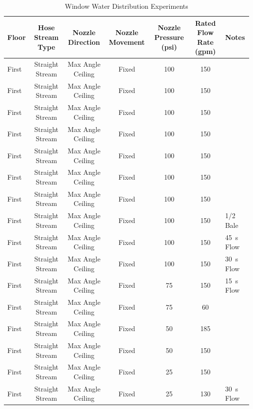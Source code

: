 \documentclass[12pt,oneside]{book}
\begin{document}
\clearpage

\begin{table}[!ht]
\centering
\scriptsize
\caption{Window Water Distribution Experiments}
\label{tab:Window_Fire_Attack_Distribution_Experiments}
\begin{tabular}{lcccccl}
\toprule[1.5pt]
Floor & Hose Stream Type & Nozzle Direction & Nozzle Movement & Nozzle Pressure (psi) & Rated Flow Rate (gpm) & Notes \\ 
\midrule

First  & Straight Stream  & Max Angle Ceiling      & Fixed              & 100 & 150 &   \\
First  & Straight Stream  & Max Angle Ceiling      & Fixed              & 100 & 150 &   \\
First  & Straight Stream  & Max Angle Ceiling      & Fixed              & 100 & 150 &   \\
First  & Straight Stream  & Max Angle Ceiling      & Fixed              & 100 & 150 &   \\
First  & Straight Stream  & Max Angle Ceiling      & Fixed              & 100 & 150 &   \\
First  & Straight Stream  & Max Angle Ceiling      & Fixed              & 100 & 150 &   \\
First  & Straight Stream  & Max Angle Ceiling      & Fixed              & 100 & 150 &   \\
First  & Straight Stream  & Max Angle Ceiling      & Fixed              & 100 & 150 & 1/2 Bale  \\
First  & Straight Stream  & Max Angle Ceiling      & Fixed              & 100 & 150 & 45~s Flow  \\
First  & Straight Stream  & Max Angle Ceiling      & Fixed              & 100 & 150 & 30~s Flow  \\
First  & Straight Stream  & Max Angle Ceiling      & Fixed              & 75  & 150 & 15~s Flow  \\
First  & Straight Stream  & Max Angle Ceiling      & Fixed              & 75  & 60 &   \\
First  & Straight Stream  & Max Angle Ceiling      & Fixed              & 50  & 185 &   \\
First  & Straight Stream  & Max Angle Ceiling      & Fixed              & 50  & 150 &   \\
First  & Straight Stream  & Max Angle Ceiling      & Fixed              & 25  & 150 &   \\
First  & Straight Stream  & Max Angle Ceiling      & Fixed              & 25  & 130 & 30~s Flow  \\

\end{tabular}
\end{table}
\end{document}
